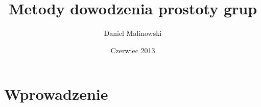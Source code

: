 \documentclass[licencjacka]{pracamgr}
\author{Daniel Malinowski}
\title{Metody dowodzenia prostoty grup}
\date{Czerwiec 2013}
\begin{document}
\maketitle

\begin{abstract}
\end{abstract}

\tableofcontents


\chapter*{Wprowadzenie}
% 
% 
% 
% 
% 
% 
% 
\end{document}

